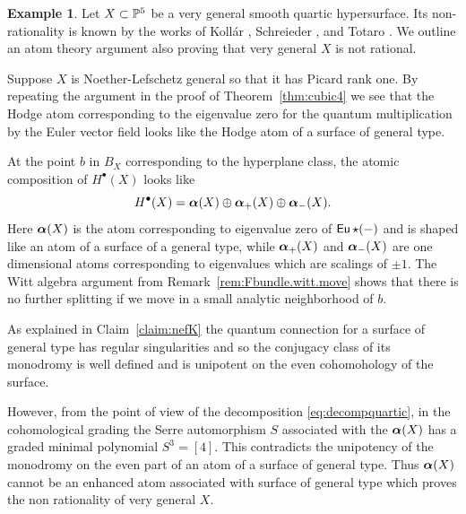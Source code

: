 \documentclass[twoside,leqno]{article}
\numberwithin{equation}{section}
\theoremstyle{plain}
\theoremstyle{definition}
\newtheorem{example}[equation]{Example}
\begin{document}
\begin{example} \label{ex:4dimquartic}
Let $X \subset \mathbb P^5$ be a very general smooth quartic hypersurface. Its non-rationality is known by  the works of Koll\'{a}r \cite{KOL}, Schreieder \cite{SCH}, and Totaro \cite{TOT}. We outline an atom
theory argument also  proving that very general $X$ is not rational.



Suppose $X$ is Noether-Lefschetz general so that it has  Picard rank one. 
By repeating the argument in the proof of
Theorem~\ref{thm:cubic4} we see that the Hodge atom corresponding to
the eigenvalue zero for the quantum multiplication by the Euler vector
field looks like the Hodge atom of a surface of general type.

At the point $b$ in $B_{X}$ corresponding to the hyperplane class, the atomic composition  of $H^{\bullet}(X)$ looks like
\begin{equation} \label{eq:decompquartic}
H^{\bullet}(X)= \boldsymbol{\alpha}(X)\oplus \boldsymbol{\alpha}_{+}(X)\oplus \boldsymbol{\alpha}_{-}(X).
\end{equation}
Here $\boldsymbol{\alpha}(X)$ is the atom corresponding to eigenvalue zero of $\operatorname{\mathsf{Eu}}\star (-)$ and is 
shaped like an atom of a surface of a general type, while $\boldsymbol{\alpha}_{+}(X)$ and $\boldsymbol{\alpha}_{-}(X)$ are one dimensional atoms corresponding to eigenvalues which are scalings of $\pm 1$. 
The  Witt algebra argument from Remark~\ref{rem:Fbundle.witt.move} shows that  there is no further splitting if we move in a small analytic neighborhood of $b$.


As explained in Claim~\ref{claim:nefK} the quantum connection for a surface of general type has regular singularities and so the conjugacy class of its monodromy is well
defined and is unipotent on the even cohomohology of the surface. 

However, from the point of view of the decomposition \eqref{eq:decompquartic}, in the cohomological grading the Serre automorphism  $S$ associated with the $\boldsymbol{\alpha}(X)$ has a graded minimal polynomial
$S^3=[4]$.
This contradicts the unipotency of the monodromy on the even part of an atom of a surface of general type. Thus $\boldsymbol{\alpha}(X)$ cannot be an enhanced atom associated with surface of general type which proves the non rationality of  very general $X$. 
\end{example}
\end{document}
